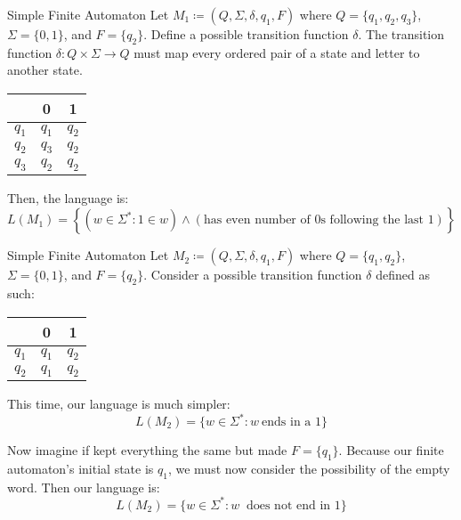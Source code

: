 \documentclass[math]{amznotes}
\begin{document}
\begin{exbox}{Simple Finite Automaton}{}
    Let $M_1 \coloneq (Q, \Sigma, \delta, q_1, F)$ where $Q = \{q_1, q_2, q_3\}$, $\Sigma = \{0, 1\}$, and $F = \{q_2\}$. Define a possible transition function $\delta$.
    \tcblower
    The transition function $\delta : Q \times \Sigma \to Q$ must map every ordered pair of a state and letter to another state.

    \begin{center}\begin{tabular}{c | c | c }
        & 0 & 1 \\ \hline
        $q_1$ & $q_1$ & $q_2$ \\
        $q_2$ & $q_3$ & $q_2$ \\
        $q_3$ & $q_2$ & $q_2$
    \end{tabular}\end{center}

    Then, the language is:
    \[ L(M_1) = \left\{ (w \in \Sigma^*: 1 \in w) \land (\text{has even number of 0s following the last 1}) \right\} \]
\end{exbox}

\begin{exbox}{Simple Finite Automaton}{}
    Let $M_2 \coloneq (Q, \Sigma, \delta, q_1, F)$ where $Q = \{q_1, q_2\}$, $\Sigma = \{0, 1\}$, and $F = \{q_2\}$. Consider a possible transition function $\delta$ defined as such:

    \begin{center}\begin{tabular}{c | c | c }
        & 0 & 1 \\ \hline
        $q_1$ & $q_1$ & $q_2$ \\
        $q_2$ & $q_1$ & $q_2$ \\
    \end{tabular}\end{center}

    This time, our language is much simpler:
    \[ L(M_2) = \{ w \in \Sigma^* : w\ \text{ends in a 1} \} \]

    Now imagine if kept everything the same but made $F = \{q_1\}$. Because our finite automaton's initial state is $q_1$, we must now consider the possibility of the empty word. Then our language is:
    \[ L(M_2) = \{ w \in \Sigma^* : w\ \text{ does not end in 1} \} \]
\end{exbox}
\end{document}
